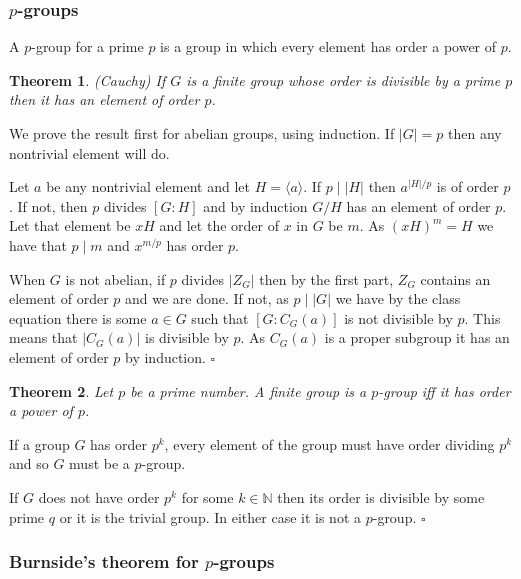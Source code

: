 \documentclass[10pt]{article}
\newcommand{\N}{\mathbb{N}}
\newtheorem{theorem}{Theorem}[section]
\newenvironment{proof}[1][Proof]{\begin{trivlist}
\item[\hskip \labelsep {\itshape #1}]}{\end{trivlist}}
\newenvironment{definition}[1][Definition]{\begin{trivlist}
\item[\hskip \labelsep {\bfseries #1}]}{\end{trivlist}}
\begin{document}
\subsubsection{$p$-groups}

\begin{definition}
A $p$-group for a prime $p$ is a group in which every element has order a power of $p$.
\end{definition}

\begin{theorem} (Cauchy)
If $G$ is a finite group whose order is divisible by a prime $p$ then it has an element of order $p$.
\end{theorem}

\begin{proof}
We prove the result first for abelian groups, using induction. If $|G| = p$ then any nontrivial element will do.

Let $a$ be any nontrivial element and let $H = \langle a \rangle$. If $p \;|\; |H|$ then $a^{|H|/p}$ is of order $p$. If not, then $p$ divides $[G:H]$ and by induction $G/H$ has an element of order $p$. Let that element be $xH$ and let the order of $x$ in $G$ be $m$. As $(xH)^m = H$ we have that $p \;|\; m$ and $x^{m/p}$ has order $p$.

When $G$ is not abelian, if $p$ divides $|Z_G|$ then by the first part, $Z_G$ contains an element of order $p$ and we are done. If not, as $p \;|\; |G|$ we have by the class equation there is some $a \in G$ such that $[G:C_G(a)]$ is not divisible by $p$. This means that $|C_G(a)|$ is divisible by $p$. As $C_G(a)$ is a proper subgroup it has an element of order $p$ by induction. $\square$
\end{proof}

\begin{theorem}
Let $p$ be a prime number. A finite group is a $p$-group iff it has order a power of $p$.
\end{theorem}

\begin{proof}
If a group $G$ has order $p^k$, every element of the group must have order dividing $p^k$ and so 
$G$ must be a $p$-group.

If $G$ does not have order $p^k$ for some $k \in \N$ then its order is divisible by some prime $q$ or it is the trivial group. In either case it is not a $p$-group. $\square$
\end{proof}

\subsubsection{Burnside's theorem for $p$-groups}
\end{document}
